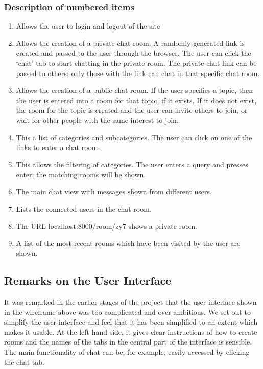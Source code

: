 \documentclass{sig-alt-release2}
\begin{document}
\subsubsection{Description of numbered items}
\begin{enumerate}
\item Allows the user to login and logout of the site
\item Allows the creation of a private chat room. A randomly generated link is created and passed to the user through the browser. The user can click the `chat' tab to start chatting in the private room. The private chat link can be passed to others: only those with the link can chat in that specific chat room. 
\item Allows the creation of  a public chat room. If the user specifies a topic, then the user is entered into a room for that topic, if it exists. If it does not exist, the room for the topic is created and the user can invite others to join, or wait for other people with the same interest to join.
\item This a list of categories and subcategories. The user can click on one of the links to enter a chat room.
\item This allows the filtering of categories. The user enters a query and presses enter; the matching rooms will be shown.
\item The main chat view with messages shown from different users.
\item Lists the connected users in the chat room.
\item The URL localhost:8000/room/zy7 shows a private room.
\item A list of the most recent rooms which have been visited by the user are shown.
\end{enumerate}

\subsection{Remarks on the User Interface}
It was remarked in the earlier stages of the project that the user interface shown in the wireframe above was too complicated and over ambitious. We set out to simplify the user interface and feel that it has been simplified to an extent which makes it usable. At the left hand side, it gives clear instructions of how to create rooms and the names of the tabs in the central part of the interface is sensible. The main functionality of chat can be, for example, easily accessed by clicking the chat tab.\\
\end{document}
